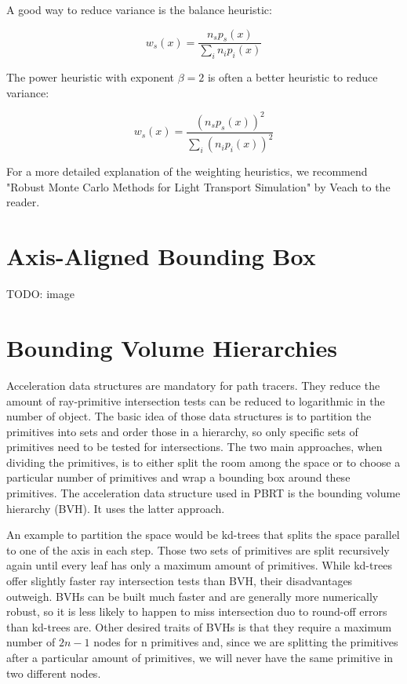 A good way to reduce variance is the balance heuristic:

\begin{equation}
w_s(x) = \frac{n_s p_s(x)}{\sum_{i}n_i p_i(x)}
\end{equation}

The power heuristic with exponent $\beta = 2$ is often a better heuristic to reduce variance:

\begin{equation}
w_s(x) = \frac{(n_s p_s(x))^2}{\sum_{i}(n_i p_i(x))^2}
\end{equation}

For a more detailed explanation of the weighting heuristics, we recommend "Robust Monte Carlo Methods for Light Transport Simulation" by Veach to the reader. \cite{RMCM}

\section{Axis-Aligned Bounding Box}

TODO: image

\section{Bounding Volume Hierarchies}
\label{sec:preliminaries:bvh}

Acceleration data structures are mandatory for path tracers. They reduce the amount of ray-primitive intersection tests can be reduced to logarithmic in the number of object. The basic idea of those data structures is to partition the primitives into sets and order those in a hierarchy, so only specific sets of primitives need to be tested for intersections. The two main approaches, when dividing the primitives, is to either split the room among the space or to choose a particular number of primitives and wrap a bounding box around these primitives. The acceleration data structure used in PBRT is the bounding volume hierarchy (BVH). It uses the latter approach.

An example to partition the space would be kd-trees that splits the space parallel to one of the axis in each step. Those two sets of primitives are split recursively again until every leaf has only a maximum amount of primitives.  While kd-trees offer slightly faster ray intersection tests than BVH, their disadvantages outweigh. BVHs can be built much faster and are generally more numerically robust, so it is less likely to happen to miss intersection duo to round-off errors than kd-trees are. Other desired traits of BVHs is that they require a maximum number of $2n - 1$ nodes for n primitives and, since we are splitting the primitives after a particular amount of primitives, we will never have the same primitive in two different nodes.

